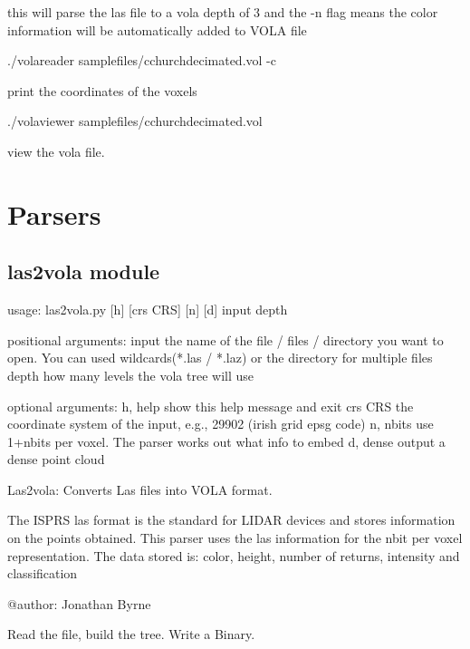\documentclass[letterpaper,10pt,english]{sphinxmanual}
\begin{document}
this will parse the las file to a vola depth of 3 and the -n flag means the
color information will be automatically added to VOLA file

./volareader samplefiles/cchurchdecimated.vol -c

print the coordinates of the voxels

./volaviewer samplefiles/cchurchdecimated.vol

view the vola file.


\chapter{Parsers}
\label{\detokenize{index:parsers}}

\section{las2vola module}
\label{\detokenize{las2vola::doc}}\label{\detokenize{las2vola:las2vola-module}}
\begin{sphinxVerbatim}[commandchars=\\\{\}]
usage: las2vola.py [\PYGZhy{}h] [\PYGZhy{}\PYGZhy{}crs CRS] [\PYGZhy{}n] [\PYGZhy{}d] input depth

positional arguments:
  input        the name of the file / files / directory you want to open. You
               can used wildcards(*.las / *.laz) or the directory for multiple
               files
  depth        how many levels the vola tree will use

optional arguments:
  \PYGZhy{}h, \PYGZhy{}\PYGZhy{}help   show this help message and exit
  \PYGZhy{}\PYGZhy{}crs CRS    the coordinate system of the input, e.g., 29902 (irish grid
               epsg code)
  \PYGZhy{}n, \PYGZhy{}\PYGZhy{}nbits  use 1+nbits per voxel. The parser works out what info to embed
  \PYGZhy{}d, \PYGZhy{}\PYGZhy{}dense  output a dense point cloud
\end{sphinxVerbatim}
\label{\detokenize{las2vola:module-las2vola}}
Las2vola: Converts Las files into VOLA format.

The ISPRS las format is the standard for LIDAR devices and stores information
on the points obtained. This parser uses the las information
for the nbit per voxel representation. The data stored is: color, height, 
number of returns, intensity and classification

@author: Jonathan Byrne

\begin{fulllineitems}
\label{\detokenize{las2vola:las2vola.main}}
Read the file, build the tree. Write a Binary.

\end{fulllineitems}
\end{document}
